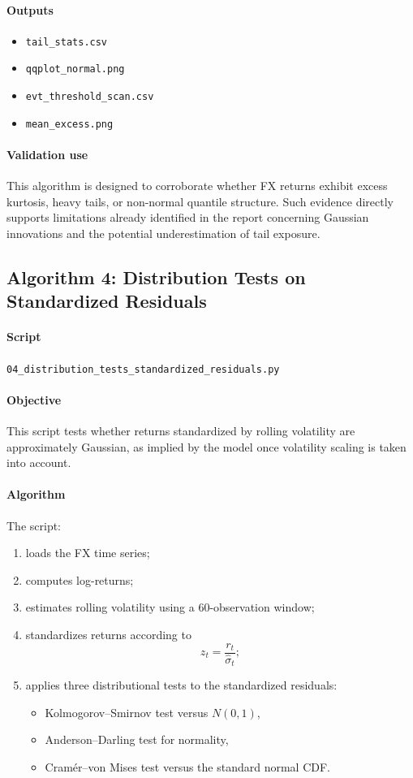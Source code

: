 	\paragraph{Outputs}
	\begin{itemize}
		\item \texttt{tail\_stats.csv}
		\item \texttt{qqplot\_normal.png}
		\item \texttt{evt\_threshold\_scan.csv}
		\item \texttt{mean\_excess.png}
	\end{itemize}
	
	\paragraph{Validation use}
	This algorithm is designed to corroborate whether FX returns exhibit excess kurtosis, heavy tails, or non-normal quantile structure. Such evidence directly supports limitations already identified in the report concerning Gaussian innovations and the potential underestimation of tail exposure.
	
	\subsection{Algorithm 4: Distribution Tests on Standardized Residuals}
	
	\paragraph{Script}
	\texttt{04\_distribution\_tests\_standardized\_residuals.py}
	
	\paragraph{Objective}
	This script tests whether returns standardized by rolling volatility are approximately Gaussian, as implied by the model once volatility scaling is taken into account.
	
	\paragraph{Algorithm}
	The script:
	\begin{enumerate}
		\item loads the FX time series;
		\item computes log-returns;
		\item estimates rolling volatility using a 60-observation window;
		\item standardizes returns according to
		\[
		z_t = \frac{r_t}{\hat{\sigma}_t};
		\]
		\item applies three distributional tests to the standardized residuals:
		\begin{itemize}
			\item Kolmogorov--Smirnov test versus \(N(0,1)\),
			\item Anderson--Darling test for normality,
			\item Cramér--von Mises test versus the standard normal CDF.
		\end{itemize}
	\end{enumerate}
	
